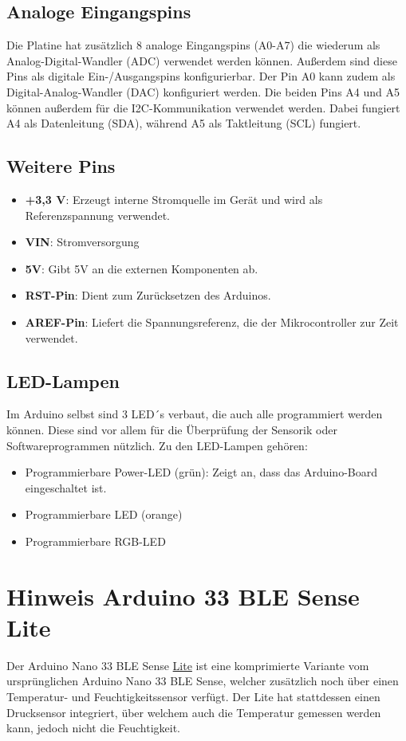 \subsection{Analoge Eingangspins}
Die Platine hat zusätzlich 8 analoge Eingangspins (A0-A7) die wiederum als Analog-Digital-Wandler (ADC) verwendet werden können. Außerdem sind diese Pins als digitale Ein-/Ausgangspins konfigurierbar. Der Pin A0 kann zudem als Digital-Analog-Wandler (DAC) konfiguriert werden. Die beiden Pins A4 und A5 können außerdem für die I2C-Kommunikation verwendet werden. Dabei fungiert A4 als Datenleitung (SDA), während A5 als Taktleitung (SCL) fungiert.\cite{Ard.2024}

\subsection{Weitere Pins}
\begin{itemize}
	\item \textbf{+3,3 V}: Erzeugt interne Stromquelle im Gerät und wird als Referenzspannung verwendet.
	\item \textbf{VIN}: Stromversorgung
	\item \textbf{5V}: Gibt 5V an die externen Komponenten ab. 
	\item \textbf{RST-Pin}: Dient zum Zurücksetzen des Arduinos.
	\item \textbf{AREF-Pin}: Liefert die Spannungsreferenz, die der Mikrocontroller zur Zeit verwendet.
	\\ \cite{Ard.2024}
\end{itemize}

\subsection{LED-Lampen}
Im Arduino selbst sind 3 LED´s verbaut, die auch alle programmiert werden können. Diese sind vor allem für die Überprüfung der Sensorik oder Softwareprogrammen nützlich. Zu den LED-Lampen gehören: 
\begin{itemize}
	\item Programmierbare Power-LED (grün): Zeigt an, dass das Arduino-Board eingeschaltet ist.
	\item Programmierbare LED (orange)
	\item Programmierbare RGB-LED
	\\ \cite{Ard.2024}
\end{itemize}

\section{Hinweis Arduino 33 BLE Sense Lite \label{Hinweis Arduino 33 BLE Sense Lite}}
Der Arduino Nano 33 BLE Sense \underline{Lite} ist eine komprimierte Variante vom ursprünglichen Arduino Nano 33 BLE Sense, welcher zusätzlich noch über einen Temperatur- und Feuchtigkeitssensor verfügt. Der Lite hat stattdessen einen Drucksensor integriert, über welchem auch die Temperatur gemessen werden kann, jedoch nicht die Feuchtigkeit.\cite{PetrFilipi.2022}
